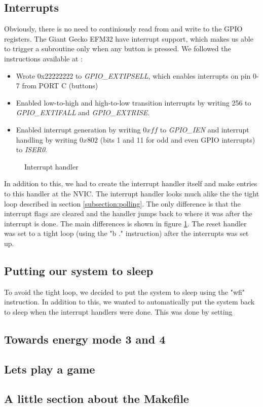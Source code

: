 	\subsection{Interrupts}
	\label{subsection:interrupts}
	Obviously, there is no need to continiously read from and write to the GPIO registers. The Giant Gecko EFM32 have interrupt support, which makes us able to trigger a subroutine only when any button is pressed. We followed the instructions available at \cite[p. 24]{compendium}:
	\begin{itemize}
		\item Wrote 0x22222222 to \emph{GPIO\_EXTIPSELL}, which enables interrupts on pin 0-7 from PORT C (buttons) \cite[p. 770]{reference_manual}
		\item Enabled low-to-high and high-to-low transition interrupts by writing 256 to \emph{GPIO\_EXTIFALL} and \emph{GPIO\_EXTRISE}.
		\item Enabled interrupt generation by writing $0xff$ to \emph{GPIO\_IEN} and interrupt handling by writing $0x802$ (bits 1 and 11 for odd and even GPIO interrupts) to \emph{ISER0}.
	\end{itemize}
	
	\begin{figure}[h]
		
		\caption{Interrupt handler}
		\label{code:interrupt_handler}
	\end{figure}


In addition to this, we had to create the interrupt handler itself and make entries to this handler at the NVIC. The interrupt handler looks much alike the the tight loop described in section \ref{subsection:polling}. The only difference is that the interrupt flags are cleared and the handler jumps back to where it was after the interrupt is done. The main differences is shown in figure \ref{code:interrupt_handler}. The reset handler was set to a tight loop (using the "b ." instruction) after the interrupts was set up.

	\subsection{Putting our system to sleep}
	To avoid the tight loop, we decided to put the system to sleep using the "wfi" instruction. In addition to this, we wanted to automatically put the system back to sleep when the interrupt handlers were done. This was done by setting 

	\subsection{Towards energy mode 3 and 4}
	
	\subsection{Lets play a game}

	\subsection{A little section about the Makefile}
